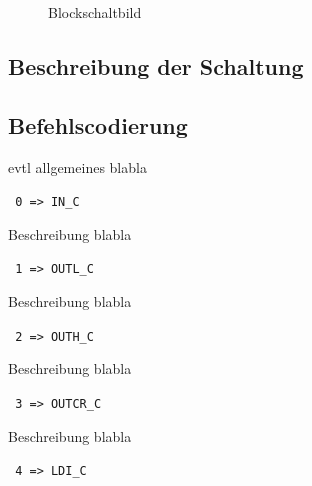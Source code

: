 \documentclass[a4paper,10pt]{scrartcl}
\begin{document}
\begin{figure}[ht]
	\centering
\noindent{}
	\caption{Blockschaltbild}
	\label{fig:block}
\end{figure}

\clearpage


\subsection{Beschreibung der Schaltung}
\label{sec:schaltung}


\subsection{Befehlscodierung}
\label{sec:bef_cod}


evtl allgemeines blabla


\noindent\texttt{ 0  =>  IN\_C}

Beschreibung blabla

\noindent\texttt{ 1  =>  OUTL\_C}

Beschreibung blabla

\noindent\texttt{ 2  =>  OUTH\_C}

Beschreibung blabla

\noindent\texttt{ 3  =>  OUTCR\_C}

Beschreibung blabla

\noindent\texttt{ 4  =>  LDI\_C}
\end{document}
